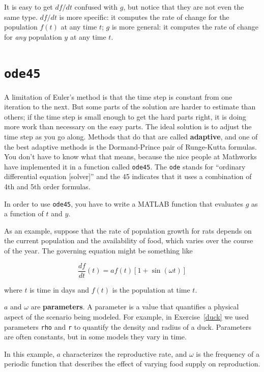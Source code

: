 \documentclass{book}
\begin{document}
It is easy to get $df/dt$ confused with $g$, but notice that they are
not even the same type.
$df/dt$ is more specific: it computes the rate of change for the
population $f(t)$ at any time $t$;
$g$ is more general: it computes the rate
of change for \textit{any} population $y$ at any time $t$.


\section{{\tt ode45}}
\label{ode45}

A limitation of Euler's method is that the time step is constant from
one iteration to the next.  But some parts of the solution are
harder to estimate than others; if the time step is small enough to
get the hard parts right, it is doing more work than necessary on the
easy parts.  The ideal solution is to adjust the time step as you go
along.  Methods that do that are called {\bf adaptive}, and one of the
best adaptive methods is the Dormand-Prince pair of Runge-Kutta
formulas.  You don't have to know what that means,
because the nice people at Mathworks have implemented it in a function
called {\tt ode45}.  The {\tt ode} stands for ``ordinary differential
equation [solver]'' and the 45 indicates that it uses a combination of
4th and 5th order formulas.

In order to use {\tt ode45}, you have to write a MATLAB function
that evaluates $g$ as a function of
$t$ and $y$.


As an example, suppose that the rate of population growth for rats
depends on the current population and the availability of food,
which varies over the course of the year.
The governing equation might be something like

\begin{equation}
\frac{df}{dt}(t) = a f(t) \left[1 + \sin (\omega t) \right]
\end{equation}

%
where $t$ is time in days and $f(t)$ is the population at time $t$.

$a$ and $\omega$ are {\bf parameters}.  A parameter is a value that
quantifies a physical aspect of the scenario being modeled.  For
example, in Exercise~\ref{duck} we used parameters {\tt rho} and
{\tt r} to quantify the density and radius of a duck.  Parameters are
often constants, but in some models they vary in time.

In this example, $a$ characterizes the reproductive rate, and
$\omega$ is the frequency of a periodic function that describes
the effect of varying food supply on reproduction.
\end{document}
